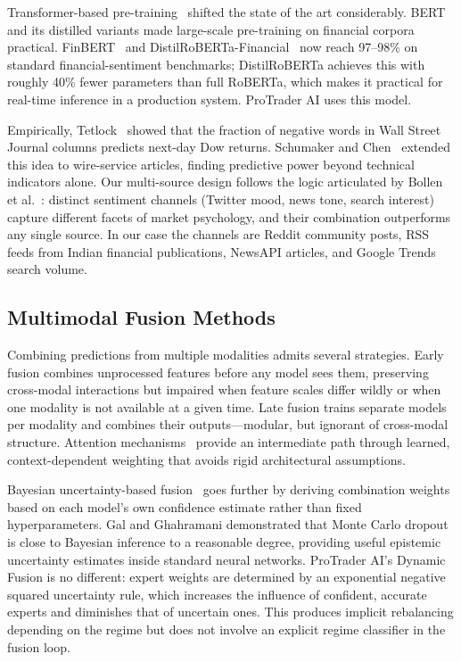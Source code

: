 \documentclass[10pt,a4paper,twoside]{article}
\begin{document}
Transformer-based pre-training~\cite{vaswani2017} shifted the state of the
art considerably. BERT~\cite{devlin2019} and its distilled variants made
large-scale pre-training on financial corpora practical. FinBERT~\cite{araci2019}
and DistilRoBERTa-Financial~\cite{liu2019} now reach 97--98\% on standard
financial-sentiment benchmarks; DistilRoBERTa achieves this with roughly 40\%
fewer parameters than full RoBERTa, which makes it practical for real-time
inference in a production system. ProTrader AI uses this model.

Empirically, Tetlock~\cite{tetlock2007} showed that the fraction of negative
words in Wall Street Journal columns predicts next-day Dow returns.
Schumaker and Chen~\cite{schumaker2009} extended this idea to wire-service
articles, finding predictive power beyond technical indicators alone. Our
multi-source design follows the logic articulated by Bollen et
al.~\cite{bollen2011}: distinct sentiment channels (Twitter mood, news tone,
search interest) capture different facets of market psychology, and their
combination outperforms any single source. In our case the channels are Reddit
community posts, RSS feeds from Indian financial publications, NewsAPI articles,
and Google Trends search volume.

\subsection{Multimodal Fusion Methods}

Combining predictions from multiple modalities admits several strategies.
Early fusion combines unprocessed features before any model sees them, preserving
cross-modal interactions but impaired when feature scales differ wildly or
when one modality is not available at a given time. Late fusion trains separate
models per modality and combines their outputs---modular, but ignorant of
cross-modal structure. Attention mechanisms~\cite{vaswani2017} provide an
intermediate path through learned, context-dependent weighting that avoids rigid
architectural assumptions.

Bayesian uncertainty-based fusion~\cite{gal2016} goes further by deriving
combination weights based on each model's own confidence estimate rather than
fixed hyperparameters. Gal and Ghahramani demonstrated that Monte Carlo dropout
is close to Bayesian inference to a reasonable degree, providing useful epistemic
uncertainty estimates inside standard neural networks. ProTrader AI's Dynamic
Fusion is no different: expert weights are determined by an exponential
negative squared uncertainty rule, which increases the influence of confident,
accurate experts and diminishes that of uncertain ones. This produces implicit
rebalancing depending on the regime but does not involve an explicit regime classifier
in the fusion loop.
\end{document}
